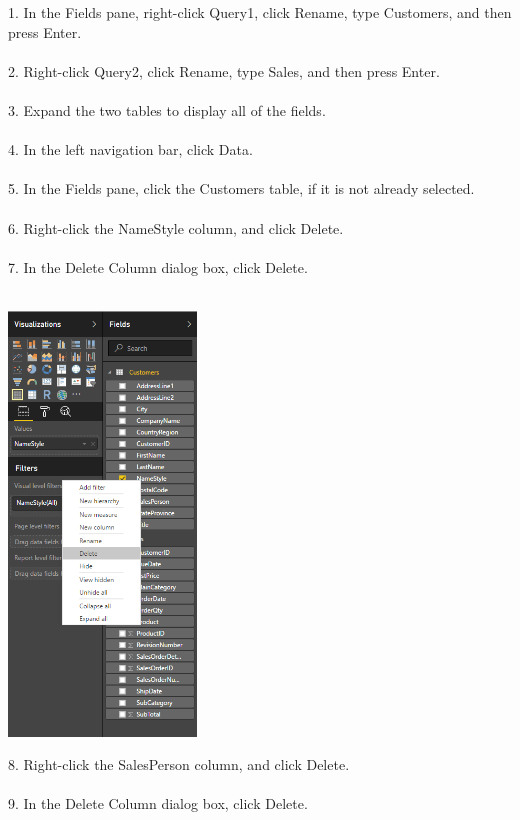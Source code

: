 \documentclass[12pt,letterpaper]{article}
\begin{document}
1. In the Fields pane, right-click Query1, click Rename, type Customers, and then press Enter.\\\\
2. Right-click Query2, click Rename, type Sales, and then press Enter.\\\\
3. Expand the two tables to display all of the fields.\\\\
4. In the left navigation bar, click Data.\\\\
5. In the Fields pane, click the Customers table, if it is not already selected.\\\\
6. Right-click the NameStyle column, and click Delete.\\\\
7. In the Delete Column dialog box, click Delete.\\\\
\begin{center}
\includegraphics[width=5cm]{IMG/4.png} 
\end{center}
8. Right-click the SalesPerson column, and click Delete.\\\\
9. In the Delete Column dialog box, click Delete.\\\\
\end{document}
